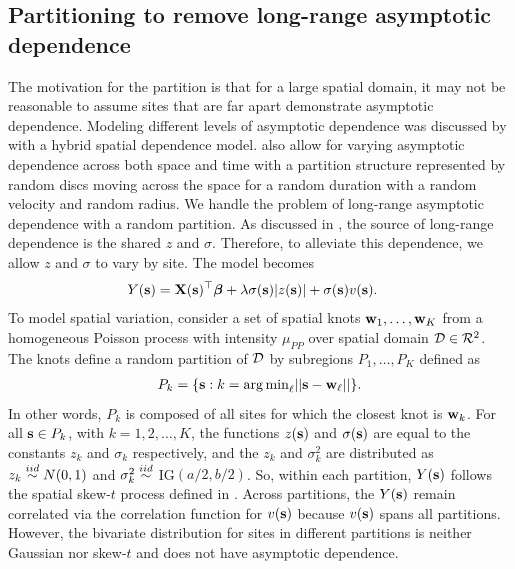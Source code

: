 \documentclass[useAMS,usenatbib,referee]{biom}
\begin{document}
\subsection{Partitioning to remove long-range asymptotic dependence}\label{sts:part}
The motivation for the partition is that for a large spatial domain, it may not be reasonable to assume sites that are far apart demonstrate asymptotic dependence.
Modeling different levels of asymptotic dependence was discussed by \citet{Wadsworth2012} with a hybrid spatial dependence model.
\citet{Huser2014} also allow for varying asymptotic dependence across both space and time with a partition structure represented by random discs moving across the space for a random duration with a random velocity and random radius.
We handle the problem of long-range asymptotic dependence with a random partition.
As discussed in , the source of long-range dependence is the shared $z$ and $\sigma$.
Therefore, to alleviate this dependence, we allow $z$ and $\sigma$ to vary by site.
The model becomes
\begin{align} \label{steq:partition}
  Y(\bs) &= \bX(\bs)^\top \bbeta + \lambda \sigma(\bs) |z(\bs)| + \sigma(\bs) v(\bs).
\end{align}
To model spatial variation, consider a set of spatial knots $\mbox{\bf w}_1, \ldots, \mbox{\bf w}_K$ from a homogeneous Poisson process with intensity $\mu_{PP}$ over spatial domain $\calD \in \calR^2$.
The knots define a random partition of $\calD$ by subregions $P_{1}, \ldots, P_{K}$ defined as
\begin{align} \label{steq:subregions}
  P_{k} = \{ \bs : k = \argmin_\ell || \bs - \bw_{\ell} || \}.
\end{align}
In other words, $P_k$ is composed of all sites for which the closest knot is $\mbox{\bf w}_k$.
For all $\mbox{\bf s} \in P_k$, with $k = 1, 2, \ldots, K$, the functions $z(\mbox{\bf s})$ and $\sigma(\mbox{\bf s})$ are equal to the constants $z_k$ and $\sigma_k$ respectively, and the $z_k$ and $\sigma^2_k$ are distributed as $z_k \stackrel{iid}{\sim} N(0, 1)$ and $\sigma^2_k \stackrel{iid}{\sim}$ IG$(a / 2, b / 2)$.
So, within each partition, $Y(\mbox{\bf s})$ follows the spatial skew-$t$ process defined in .
Across partitions, the $Y(\mbox{\bf s})$ remain correlated via the correlation function for $v(\mbox{\bf s})$ because $v(\mbox{\bf s})$ spans all partitions.
However, the bivariate distribution for sites in different partitions is neither Gaussian nor skew-$t$ and does not have asymptotic dependence.
\end{document}
